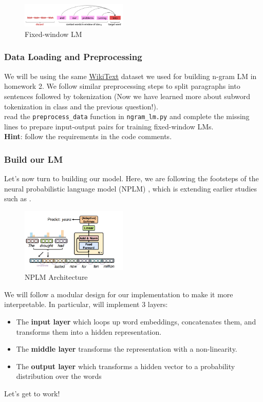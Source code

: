 \begin{figure}[h]
    \centering
    \includegraphics[width=0.45\textwidth]{figures/fixed_window_lm.png}
    \caption{Fixed-window LM}
\end{figure}

\subsubsection{Data Loading and Preprocessing}
We will be using the same \href{https://huggingface.co/datasets/wikitext}{WikiText} dataset we used for building n-gram LM in homework 2. We follow similar preprocessing steps to split paragraphs into sentences followed by tokenization (Now we have learned more about subword tokenization in class and the previous question!).\\

\noindent\todo{} read the \texttt{preprocess\_data} function in \texttt{ngram\_lm.py} and complete the missing lines to prepare input-output pairs for training fixed-window LMs.\\
\noindent \textbf{Hint}: follow the requirements in the code comments.

\subsubsection{Build our LM}
Let's now turn to building our model.
Here, we are following the footsteps of the neural probabilistic language model (NPLM) \citep{sun2021revisiting}, which is extending earlier studies such as \citet{bengio2003a}.   

\begin{figure}[h]
    \centering
    \includegraphics[width=0.45\textwidth]{figures/nplm.png}
    \caption{NPLM Architecture}
\end{figure}

We will follow a modular design for our implementation to make it more interpretable.
In particular, will implement 3 layers:
\begin{itemize}
    \item The \textbf{input layer} which loops up word embeddings, concatenates them, and transforms them into a hidden representation.
    \item The \textbf{middle layer} transforms the representation with a non-linearity.
    \item The \textbf{output layer} which transforms a hidden vector to a probability distribution over the words
\end{itemize}
Let's get to work!\\

